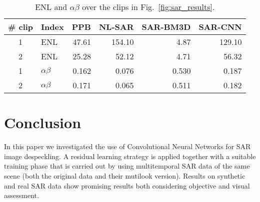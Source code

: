 \documentclass{article}
\begin{document}
\begin{figure*}[t]
	\vspace{-1em}
	\caption{Results on a COSMO-SkyMed image. Left to right: original single-look clip, PPB, NL-SAR, SAR-BM3D, SAR-CNN.}
	\label{fig:sar_results}
\end{figure*}

\begin{table}
\centering
\caption{ENL and $\alpha\beta$ over the clips in Fig.~\ref{fig:sar_results}.}
\label{ENL_alfabeta}
\small
\begin{tabular}{clrrrr}
\toprule
\# clip & Index & PPB & NL-SAR & SAR-BM3D & SAR-CNN \\
\midrule
1 & ENL           & 47.61 & 154.10 &  4.87 & 129.10 \\
2 & ENL           & 25.28 & 52.12 & 4.71 & 56.32 \\
\midrule
1 & $\alpha\beta$ & 0.162 &  0.076 & 0.530 & 0.187 \\
2 & $\alpha\beta$ & 0.171 & 0.065 & 0.511 & 0.182 \\
\bottomrule
\end{tabular}
\end{table}

\section{Conclusion}

In this paper we investigated the use of Convolutional Neural Networks for SAR image despeckling.
A residual learning strategy is applied together with a suitable training phase
that is carried out by using multitemporal SAR data of the same scene
(both the original data and their mutilook version).
Results on synthetic and real SAR data show promising results both considering objective and
visual assessment.

\small


\end{document}
